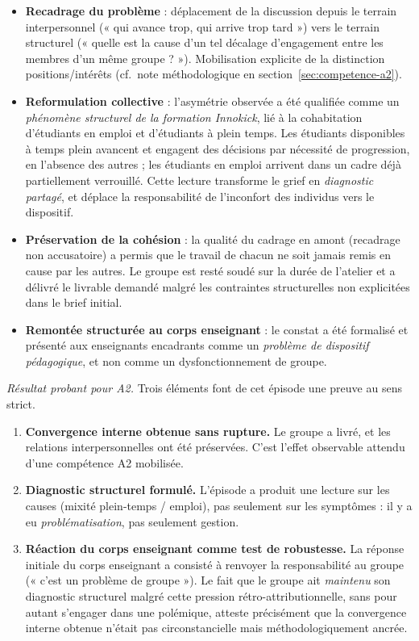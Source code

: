 \begin{itemize}
  \item \textbf{Recadrage du problème} : déplacement de la discussion depuis le terrain interpersonnel (« qui avance trop, qui arrive trop tard ») vers le terrain structurel (« quelle est la cause d'un tel décalage d'engagement entre les membres d'un même groupe ? »). Mobilisation explicite de la distinction positions/intérêts (cf.~note méthodologique en section~\ref{sec:competence-a2}).
  \item \textbf{Reformulation collective} : l'asymétrie observée a été qualifiée comme un \emph{phénomène structurel de la formation Innokick}, lié à la cohabitation d'étudiants en emploi et d'étudiants à plein temps. Les étudiants disponibles à temps plein avancent et engagent des décisions par nécessité de progression, en l'absence des autres ; les étudiants en emploi arrivent dans un cadre déjà partiellement verrouillé. Cette lecture transforme le grief en \emph{diagnostic partagé}, et déplace la responsabilité de l'inconfort des individus vers le dispositif.
  \item \textbf{Préservation de la cohésion} : la qualité du cadrage en amont (recadrage non accusatoire) a permis que le travail de chacun ne soit jamais remis en cause par les autres. Le groupe est resté soudé sur la durée de l'atelier et a délivré le livrable demandé malgré les contraintes structurelles non explicitées dans le brief initial.
  \item \textbf{Remontée structurée au corps enseignant} : le constat a été formalisé et présenté aux enseignants encadrants comme un \emph{problème de dispositif pédagogique}, et non comme un dysfonctionnement de groupe.
\end{itemize}

\textit{Résultat probant pour A2.} Trois éléments font de cet épisode une preuve au sens strict.

\begin{enumerate}
  \item \textbf{Convergence interne obtenue sans rupture.} Le groupe a livré, et les relations interpersonnelles ont été préservées. C'est l'effet observable attendu d'une compétence A2 mobilisée.
  \item \textbf{Diagnostic structurel formulé.} L'épisode a produit une lecture sur les causes (mixité plein-temps / emploi), pas seulement sur les symptômes : il y a eu \emph{problématisation}, pas seulement gestion.
  \item \textbf{Réaction du corps enseignant comme test de robustesse.} La réponse initiale du corps enseignant a consisté à renvoyer la responsabilité au groupe (« c'est un problème de groupe »). Le fait que le groupe ait \emph{maintenu} son diagnostic structurel malgré cette pression rétro-attributionnelle, sans pour autant s'engager dans une polémique, atteste précisément que la convergence interne obtenue n'était pas circonstancielle mais méthodologiquement ancrée.
\end{enumerate}

